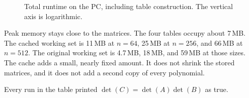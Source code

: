 \begin{figure}[!t]
\centering
{}
\caption{Total runtime on the PC, including table construction. The vertical axis is logarithmic.}
\label{fig:cache}
\end{figure}

Peak memory stays close to the matrices.
The four tables occupy about 7\,MB.
The cached working set is 11\,MB at \(n = 64\), 25\,MB at \(n = 256\), and 66\,MB at \(n = 512\).
The original working set is 4.7\,MB, 18\,MB, and 59\,MB at those sizes.
The cache adds a small, nearly fixed amount.
It does not shrink the stored matrices, and it does not add a second copy of every polynomial.

Every run in the table printed \(\det(C) = \det(A)\det(B)\) as true.
